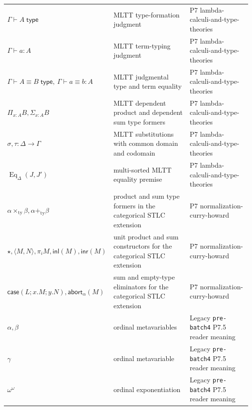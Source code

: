 \begin{longtable}{@{}p{}p{}p{}@{}}
\(\Gamma\vdash A\;\mathsf{type}\) & MLTT type-formation judgment & P7 lambda-\allowbreak{}calculi-\allowbreak{}and-\allowbreak{}type-\allowbreak{}theories \\
\(\Gamma\vdash a:A\) & MLTT term-typing judgment & P7 lambda-\allowbreak{}calculi-\allowbreak{}and-\allowbreak{}type-\allowbreak{}theories \\
\(\Gamma\vdash A\equiv B\;\mathsf{type},\allowbreak \ \Gamma\vdash a\equiv b:A\) & MLTT judgmental type and term equality & P7 lambda-\allowbreak{}calculi-\allowbreak{}and-\allowbreak{}type-\allowbreak{}theories \\
\(\Pi_{x:A}B,\allowbreak \Sigma_{x:A}B\) & MLTT dependent product and dependent sum type formers & P7 lambda-\allowbreak{}calculi-\allowbreak{}and-\allowbreak{}type-\allowbreak{}theories \\
\(\sigma,\allowbreak \tau:\Delta\to\Gamma\) & MLTT substitutions with common domain and codomain & P7 lambda-\allowbreak{}calculi-\allowbreak{}and-\allowbreak{}type-\allowbreak{}theories \\
\(\operatorname{Eq}_{\Delta}(J,\allowbreak J')\) & multi-sorted MLTT equality premise & P7 lambda-\allowbreak{}calculi-\allowbreak{}and-\allowbreak{}type-\allowbreak{}theories \\
\(\alpha\mathbin{\times_{\mathrm{ty}}}\beta,\allowbreak \alpha\mathbin{+_{\mathrm{ty}}}\beta\) & product and sum type formers in the categorical STLC extension & P7 normalization-\allowbreak{}curry-\allowbreak{}howard \\
\(\star,\allowbreak \langle M,\allowbreak N\rangle,\allowbreak \pi_iM,\allowbreak \mathsf{inl}(M),\allowbreak \mathsf{inr}(M)\) & unit product and sum constructors for the categorical STLC extension & P7 normalization-\allowbreak{}curry-\allowbreak{}howard \\
\(\mathsf{case}(L;\allowbreak x.M;\allowbreak y.N),\allowbreak \mathsf{abort}_{\alpha}(M)\) & sum and empty-type eliminators for the categorical STLC extension & P7 normalization-\allowbreak{}curry-\allowbreak{}howard \\
\(\alpha,\allowbreak \beta\) & ordinal metavariables & Legacy \texttt{pre-\allowbreak{}batch4} P7.\allowbreak{}5 reader meaning \\
\(\gamma\) & ordinal metavariable & Legacy \texttt{pre-\allowbreak{}batch4} P7.\allowbreak{}5 reader meaning \\
\(\omega^\omega\) & ordinal exponentiation & Legacy \texttt{pre-\allowbreak{}batch4} P7.\allowbreak{}5 reader meaning \\

\end{longtable}
